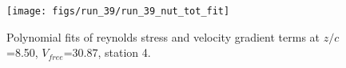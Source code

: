 \begin{figure}[H]
\centering
\texttt{[image: figs/run\_39/run\_39\_nut\_tot\_fit]}
\caption{Polynomial fits of reynolds stress and velocity gradient terms at $z/c$=8.50, $V_{free}$=30.87, station 4.}
\label{fig:run_39_nut_tot_fit}
\end{figure}


